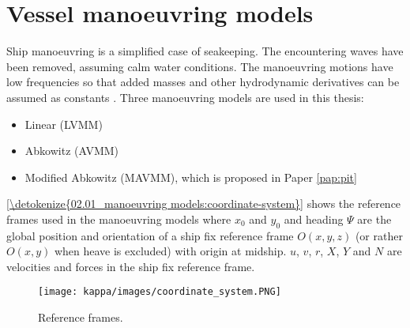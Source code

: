 \section{Vessel manoeuvring models} \label{sec:manoeuvring model}
\label{\detokenize{02.01_manoeuvring models:vessel-manoeuvring-models}}\label{\detokenize{02.01_manoeuvring models:vmm}}\label{\detokenize{02.01_manoeuvring models::doc}}
\vspace{-0.2cm}
Ship manoeuvring is a simplified case of seakeeping. The encountering waves have been removed, assuming calm water conditions. The manoeuvring motions have low frequencies so that added masses and other hydrodynamic derivatives can be assumed as constants  \cite{fossen_handbook_2011}. Three manoeuvring models are used in this thesis: 
\begin{itemize}
    \item Linear (LVMM) \cite{matusiak_dynamics_2021}
    \item Abkowitz (AVMM) \cite{abkowitz_ship_1964}
    \item Modified Abkowitz (MAVMM), which is proposed in Paper \ref{pap:pit}
\end{itemize}

\noindent\autoref{\detokenize{02.01_manoeuvring models:coordinate-system}} shows the reference frames used in the manoeuvring models where \(x_0\) and \(y_0\) and heading \(\Psi\) are the global position and orientation of a ship fix reference frame \(O(x,y,z)\) (or rather \(O(x,y)\) when heave is excluded) with origin at midship. \(u\), \(v\), \(r\), \(X\), \(Y\) and \(N\) are velocities and forces in the ship fix reference frame.



\begin{figure}[H]
    \centering
    \texttt{[image: kappa/images/coordinate\_system.PNG]}
    \caption{Reference frames.}
    \label{\detokenize{02.01_manoeuvring models:coordinate-system}}
\end{figure}

